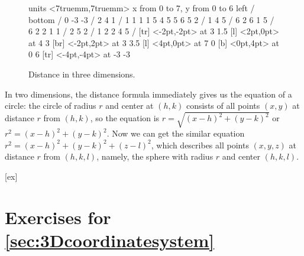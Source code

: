 \begin{figure}[H]
\centerline{
\vbox{\beginpicture
\normalgraphs
\setcoordinatesystem units <7truemm,7truemm>
\setplotarea x from 0 to 7, y from 0 to 6
\axis left /
\axis bottom /
 0 -3 -3 /
\setdashes
{} 2 4 1 /
 1 1 1 1 5 4 5 5 6 5 2 /
 1 4 5 /
 6 2 6 1 5 /
\setdots
{} 6 2 2 1 1 /
 2 5 2 /
\setsolid
{} 1 2 2 4 5 /
 [tr] <-2pt,-2pt> at 3 1.5
 [l] <2pt,0pt> at 4 3
 [br] <-2pt,2pt> at 3 3.5
 [l] <4pt,0pt> at 7 0
 [b] <0pt,4pt> at 0 6
 [tr] <-4pt,-4pt> at -3 -3
\endpicture}}
\caption{Distance in three dimensions. \label{fig:3d distance formula}}
\end{figure}

In two dimensions, the distance formula immediately gives us the
equation of a circle: the circle of radius $r$ and center at $(h,k)$
consists of all points $(x,y)$ at distance $r$ from $(h,k)$, so the
equation is $r=\sqrt{(x-h)^2+(y-k)^2}$ or $r^2=(x-h)^2+(y-k)^2$. Now
we can get the similar equation $r^2=(x-h)^2+(y-k)^2+(z-l)^2$, which
describes all points $(x,y,z)$ at distance $r$ from $(h,k,l)$, namely,
the sphere with radius $r$ and center $(h,k,l)$.

[ex]
\section*{Exercises for \ref{sec:3Dcoordinatesystem}}


